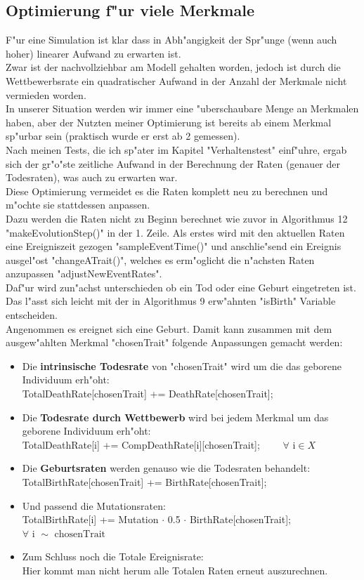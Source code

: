 \documentclass[11pt, a4paper, german]{article}
\begin{document}
	\subsection{Optimierung f"ur viele Merkmale}
	F"ur eine Simulation ist klar dass in Abh"angigkeit der Spr"unge (wenn auch hoher) linearer Aufwand zu erwarten ist.\\
	Zwar ist der nachvollziehbar am Modell gehalten worden, jedoch ist durch die Wettbewerbsrate ein quadratischer Aufwand in der Anzahl der Merkmale nicht vermieden worden.\\
	In unserer Situation werden wir immer eine "uberschaubare Menge an Merkmalen haben, aber der Nutzten meiner Optimierung ist bereits ab einem Merkmal sp"urbar sein (praktisch wurde er erst ab 2 gemessen).\\
	Nach meinen Tests, die ich sp"ater im Kapitel "{}Verhaltenstest"{} einf"uhre, ergab sich der gr"o"ste zeitliche Aufwand in der Berechnung der Raten (genauer der Todesraten), was auch zu erwarten war.\\
	Diese Optimierung vermeidet es die Raten komplett neu zu berechnen und m"ochte sie stattdessen anpassen. \\
	Dazu werden die Raten nicht zu Beginn berechnet wie zuvor in Algorithmus 12 "{}makeEvolutionStep()"{} in der 1. Zeile. Als erstes wird mit den aktuellen Raten eine Ereigniszeit gezogen "{}sampleEventTime()"{} und anschlie"send ein Ereignis ausgel"ost "{}changeATrait()"{}, welches es erm"oglicht die n"achsten Raten anzupassen "{}adjustNewEventRates"{}.\\
	Daf"ur wird zun"achst unterschieden ob ein Tod oder eine Geburt eingetreten ist. Das l"asst sich leicht mit der in Algorithmus 9 erw"ahnten "{}isBirth"{} Variable entscheiden.\\
	Angenommen es ereignet sich eine Geburt. Damit kann zusammen mit dem ausgew"ahlten Merkmal "{}chosenTrait"{} folgende Anpassungen gemacht werden:
	\begin{itemize}
		\item Die \textbf{intrinsische Todesrate} von "{}chosenTrait"{} wird um die das geborene Individuum erh"oht:\\ 
		TotalDeathRate[chosenTrait] += DeathRate[chosenTrait];
		\item Die \textbf{Todesrate durch Wettbewerb} wird bei jedem Merkmal um das geborene Individuum erh"oht:\\
		TotalDeathRate[i] += CompDeathRate[i][chosenTrait]; $ \qquad \forall \text{ i} \in X $
		\item Die \textbf{Geburtsraten} werden genauso wie die Todesraten behandelt:\\
		TotalBirthRate[chosenTrait] += BirthRate[chosenTrait];
		\item Und passend die Mutationsraten:\\
		TotalBirthRate[i] += Mutation $ \cdot $ 0.5 $ \cdot $ BirthRate[chosenTrait]; \\
		$\forall \text{ i } \sim \text{ chosenTrait} $
		\item Zum Schluss noch die Totale Ereignisrate:\\
		Hier kommt man nicht herum alle Totalen Raten erneut auszurechnen.
	\end{itemize}
\end{document}
